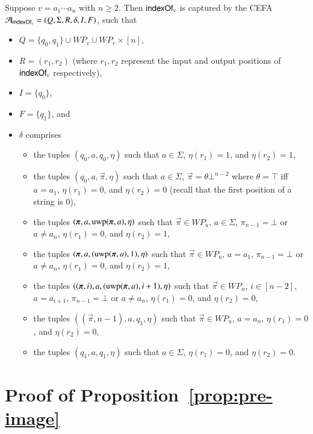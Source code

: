 Suppose $v = a_1 \cdots a_n$ with $n \ge 2$. 
Then $\mathsf{indexOf}_v$ is captured by the CEFA $\mathcal{A}_{\mathsf{indexOf}_v}=(Q, \Sigma, R, \delta, I, F)$, such that 
\begin{itemize}
\item $Q = \{q_0, q_1\} \cup WP_v \cup WP_v \times [n]$, 
\item $R=(r_1, r_2)$ (where $r_1,r_2$ represent the input and output positions of $\mathsf{indexOf}_v$ respectively), 
\item $I=\{q_0\}$, 
\item $F=\{q_1\}$, and 
\item $\delta$ comprises 
\begin{itemize}
\item the tuples $(q_0, a, q_0, \eta)$ such that $a \in \Sigma$, $\eta(r_1)=1$, and $\eta(r_2) = 1$,
%
\item the tuples $(q_0, a, \vec{\pi}, \eta)$ such that $a \in \Sigma$, $\vec{\pi} = \theta \bot^{n-2}$ where $\theta  = \top$ iff $a = a_1$, $\eta(r_1) = 0$, and $\eta(r_2)= 0$ (recall that the first position of a string is $0$),
% 
\item the tuples  $(\vec{\pi}, a, \uwp(\vec{\pi}, a), \eta)$ such that $\vec{\pi} \in WP_u$, $a \in \Sigma$, $\pi_{n-1} = \bot$ or $a \neq a_{n}$, $\eta(r_1) = 0$, and $\eta(r_2)= 1$,
%
\item the tuples $(\vec{\pi}, a, (\uwp(\vec{\pi}, a), 1), \eta)$ such that $\vec{\pi} \in WP_u$, $a = a_1$, $\pi_{n-1} = \bot$ or $a \neq a_{n}$, $\eta(r_1) = 0$, and $\eta(r_2)= 1$,
%
\item the tuples $((\vec{\pi}, i),  a, (\uwp(\vec{\pi}, a), i+1), \eta)$ such that $\vec{\pi} \in WP_u$, $i \in [n-2]$, $a = a_{i+1}$, $\pi_{n-1} = \bot$ or $a \neq a_{n}$, $\eta(r_1) = 0$, and $\eta(r_2)= 0$,
%
\item the tuples $((\vec{\pi}, n-1),  a, q_1, \eta)$ such that $\vec{\pi} \in WP_u$, $a = a_{n}$, $\eta(r_1) =0$, and $\eta(r_2)= 0$,
%
\item the tuples  $(q_1, a, q_1, \eta)$ such that $a \in \Sigma$, $\eta(r_1) = 0$, and $\eta(r_2)= 0$.
\end{itemize}
\end{itemize}



\section{Proof of Proposition~\ref{prop:pre-image}}\label{app:pre-image}


